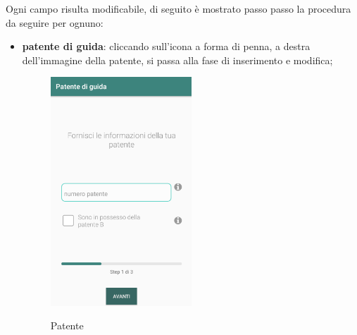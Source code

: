 Ogni campo risulta modificabile, di seguito è mostrato passo passo la procedura da seguire per ognuno:
\begin{itemize}
	\item \textbf{patente di guida}: cliccando sull'icona a forma di penna, a destra dell'immagine della patente, si passa alla fase di inserimento e modifica;
	 \begin{figure}[H] 
		\centering 
		\includegraphics[width=0.5\textwidth]{res/images/patente1.png}\\
		\caption{Patente}
		\label{patente}
	\end{figure}
\pagebreak


\end{itemize}
